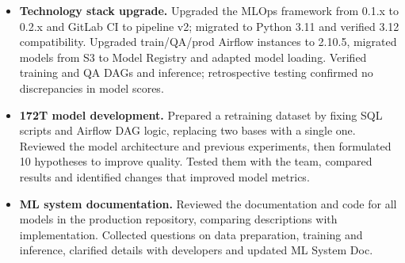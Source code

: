 \documentclass[a4paper,11pt]{article}
\begin{document}
\begin{itemize}
\item \textbf{Technology stack upgrade.} Upgraded the MLOps framework from 0.1.x to 0.2.x and GitLab CI to pipeline v2; migrated to Python 3.11 and verified 3.12 compatibility. Upgraded train/QA/prod Airflow instances to 2.10.5, migrated models from S3 to Model Registry and adapted model loading. Verified training and QA DAGs and inference; retrospective testing confirmed no discrepancies in model scores.
\item \textbf{172T model development.} Prepared a retraining dataset by fixing SQL scripts and Airflow DAG logic, replacing two bases with a single one. Reviewed the model architecture and previous experiments, then formulated 10 hypotheses to improve quality. Tested them with the team, compared results and identified changes that improved model metrics.
\item \textbf{ML system documentation.} Reviewed the documentation and code for all models in the production repository, comparing descriptions with implementation. Collected questions on data preparation, training and inference, clarified details with developers and updated ML System Doc.
\end{itemize}
\newpage
\end{document}

